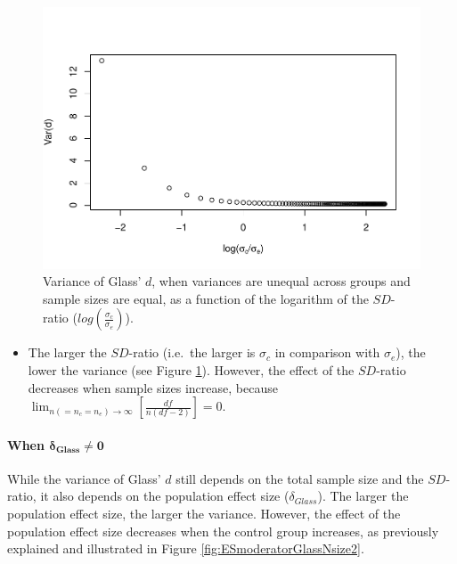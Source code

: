 \documentclass[
  english,
  man,mask]{apa6}
\providecommand{\tightlist}{%
  \setlength{\itemsep}{0pt}\setlength{\parskip}{0pt}}
\let\oldparagraph\paragraph
\renewcommand{\paragraph}[1]{\oldparagraph{#1}\mbox{}}
\begin{document}
\begin{figure}
\centering
\includegraphics{Theoretical-Variance-of-all-estimators-as-a-function-of-population-parameters_files/figure-latex/varglasshetbalSDratio2-1.pdf}
\caption{\label{fig:varglasshetbalSDratio2}Variance of Glass' \(d\), when variances are unequal across groups and sample sizes are equal, as a function of the logarithm of the \(SD\)-ratio (\(log \left( \frac{\sigma_c}{\sigma_e} \right)\)).}
\end{figure}

\begin{itemize}
\tightlist
\item
  The larger the \(SD\)-ratio (i.e.~the larger is \(\sigma_c\) in comparison with \(\sigma_e\)), the lower the variance (see Figure \ref{fig:varglasshetbalSDratio2}). However, the effect of the \(SD\)-ratio decreases when sample sizes increase, because \(\lim_{n(=n_c=n_e)\rightarrow \infty}\left[\frac{df}{n(df-2)} \right]=0\).
\end{itemize}

\hypertarget{when-bmdelta_glass-neq-0-1}{%
\paragraph{\texorpdfstring{When \(\bm{\delta_{Glass} \neq 0}\)}{When \textbackslash bm\{\textbackslash delta\_\{Glass\} \textbackslash neq 0\}}}\label{when-bmdelta_glass-neq-0-1}}

While the variance of Glass' \(d\) still depends on the total sample size and the \(SD\)-ratio, it also depends on the population effect size (\(\delta_{Glass}\)). The larger the population effect size, the larger the variance. However, the effect of the population effect size decreases when the control group increases, as previously explained and illustrated in Figure \ref{fig:ESmoderatorGlassNsize2}.
\end{document}
